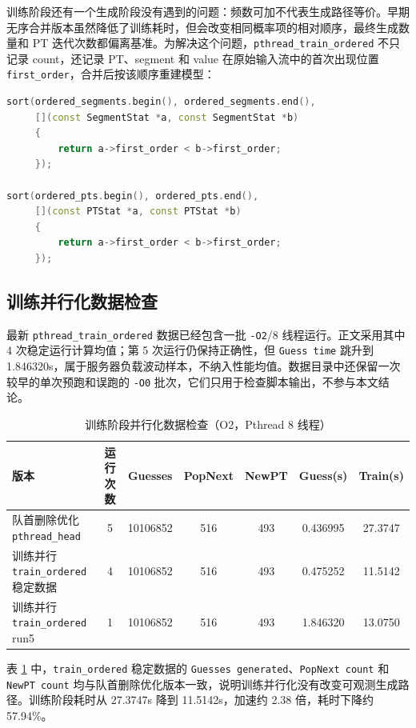 \documentclass[UTF8,a4paper,12pt]{ctexart}
\begin{document}
训练阶段还有一个生成阶段没有遇到的问题：频数可加不代表生成路径等价。早期无序合并版本虽然降低了训练耗时，但会改变相同概率项的相对顺序，最终生成数量和 PT 迭代次数都偏离基准。为解决这个问题，\texttt{pthread\_train\_ordered} 不只记录 count，还记录 PT、segment 和 value 在原始输入流中的首次出现位置 \texttt{first\_order}，合并后按该顺序重建模型：

\begin{lstlisting}[language=C++]
sort(ordered_segments.begin(), ordered_segments.end(),
     [](const SegmentStat *a, const SegmentStat *b)
     {
         return a->first_order < b->first_order;
     });

sort(ordered_pts.begin(), ordered_pts.end(),
     [](const PTStat *a, const PTStat *b)
     {
         return a->first_order < b->first_order;
     });
\end{lstlisting}

\subsection{训练并行化数据检查}

最新 \texttt{pthread\_train\_ordered} 数据已经包含一批 \texttt{-O2}/8 线程运行。正文采用其中 4 次稳定运行计算均值；第 5 次运行仍保持正确性，但 \texttt{Guess time} 跳升到 1.846320s，属于服务器负载波动样本，不纳入性能均值。数据目录中还保留一次较早的单次预跑和误跑的 \texttt{-O0} 批次，它们只用于检查脚本输出，不参与本文结论。

\begin{table}[htbp]
  \centering
  \caption{训练阶段并行化数据检查（O2，Pthread 8 线程）}
  \label{tab:train-ordered}
  \small
  \begin{tabular}{lcccccc}
    \toprule
    版本 & 运行次数 & Guesses & PopNext & NewPT & Guess(s) & Train(s) \\
    \midrule
    队首删除优化 \texttt{pthread\_head} & 5 & 10106852 & 516 & 493 & 0.436995 & 27.3747 \\
    训练并行 \texttt{train\_ordered} 稳定数据 & 4 & 10106852 & 516 & 493 & 0.475252 & 11.5142 \\
    训练并行 \texttt{train\_ordered} run5 & 1 & 10106852 & 516 & 493 & 1.846320 & 13.0750 \\
    \bottomrule
  \end{tabular}
\end{table}

表 \ref{tab:train-ordered} 中，\texttt{train\_ordered} 稳定数据的 \texttt{Guesses generated}、\texttt{PopNext count} 和 \texttt{NewPT count} 均与队首删除优化版本一致，说明训练并行化没有改变可观测生成路径。训练阶段耗时从 27.3747s 降到 11.5142s，加速约 2.38 倍，耗时下降约 57.94\%。
\end{document}
